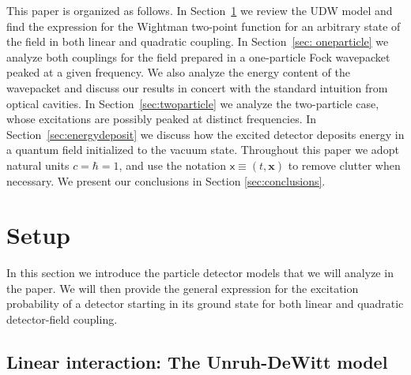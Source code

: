 \documentclass[prd,twocolumn,superscriptaddress,nofootinbib,floatfix,amsmath,amssymb]{revtex4-2}
\newcommand{\bx}{\bm{x}}
\newcommand{\sx}{\mathsf{x}}
\begin{document}
    This paper is organized as follows. In Section~\ref{sec:setup} we review the UDW model and find the expression for the Wightman two-point function for an arbitrary state of the field in both linear and quadratic coupling. In Section~\ref{sec: oneparticle} we analyze both couplings for the field prepared in a one-particle Fock wavepacket peaked at a given frequency. We also analyze the energy content of the wavepacket and discuss our results in concert with the standard intuition from optical cavities. In Section~\ref{sec:twoparticle} we analyze the two-particle case, whose excitations are possibly peaked at distinct frequencies. In Section~\ref{sec:energydeposit} we discuss how the excited detector deposits energy in a quantum field initialized to the vacuum state. Throughout this paper we adopt natural units $c= \hbar = 1$, and use the notation $\sx\equiv (t,\bx)$ to remove clutter when necessary. We present our conclusions in Section \ref{sec:conclusions}.
    
    
    
    
    
    
    
    
    
    
   
    \section{Setup}
    \label{sec:setup}
    
    In this section we introduce the particle detector models that we will analyze in the paper. We will then provide the general expression for the excitation probability of a detector starting in its ground state for both linear and quadratic detector-field coupling. %
    
    
    
    
    
    
    
    
    
    
    
    
    \subsection{Linear interaction: The Unruh-DeWitt model}
    \label{subsec: linear-interaction-setup}
	
\end{document}
